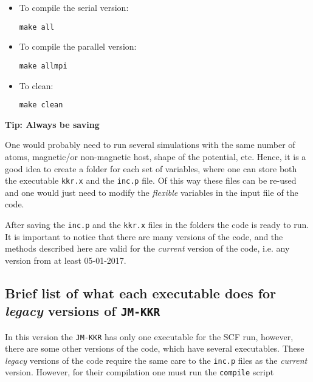 \documentclass[11pt,fleqn]{book} %
\begin{document}
\begin{itemize}
\item To compile the serial version:
\begin{VBox}
\begin{verbatim}
make all
\end{verbatim}
\end{VBox}
\item To compile the parallel version:
\begin{VBox}
\begin{verbatim}
make allmpi
\end{verbatim}
\end{VBox}
\item To clean:
\begin{VBox}
\begin{verbatim}
make clean
\end{verbatim}
\end{VBox}
 \end{itemize}
\begin{fBox}

{\Large{\textbf{\sffamily\textcolor{FZJTeal}{Tip: Always be saving}}}}

One would probably need to run several simulations with the same number of atoms, magnetic/or non-magnetic host, shape of the potential, etc. Hence, it is a good idea to create a folder for each set of variables, where one can store both the executable \verb;kkr.x; and the \verb;inc.p; file. Of this way these files can be re-used and one would just need to modify the \textit{flexible} variables in the input file of the code.

\end{fBox} 

After saving the \verb;inc.p; and the \verb;kkr.x; files in the folders the code is ready to run. It is important to notice that there are many versions of the code, and the methods described here are valid for the \textit{current} version of the code, i.e. any version from at least 05-01-2017. 

\subsection{Brief list of what each executable does for \textit{legacy} versions of \texttt{JM-KKR}}
\label{sec:executables}

In this version the \verb;JM-KKR; has only one executable for the SCF run, however, there are some other versions of the code, which have several executables. These \textit{legacy} versions of the code require the same care to the \verb;inc.p; files as the \textit{current} version. However, for their compilation one must run the \verb;compile; script
\end{document}
